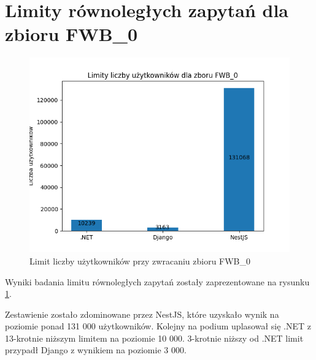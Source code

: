 \section{Limity równoległych zapytań dla zbioru FWB\_0}

\begin{figure}[!hb]
	\centering \includegraphics[width=1\linewidth]{rysunki/Limity_liczby_uzytkownikow_dla_zboru_FWB_0.png}
	\caption{Limit liczby użytkowników przy zwracaniu zbioru FWB\_0}
	\label{rys:limit_vus_fwb_0}
\end{figure}

Wyniki badania limitu równoległych zapytań zostały zaprezentowane na rysunku \ref{rys:limit_vus_fwb_0}.

Zestawienie zostało zdominowane przez NestJS, które uzyskało wynik na poziomie ponad 131 000 użytkowników.
Kolejny na podium uplasował się .NET z 13-krotnie niższym limitem na poziomie 10 000.
3-krotnie niższy od .NET limit przypadł Django z wynikiem na poziomie 3 000.
